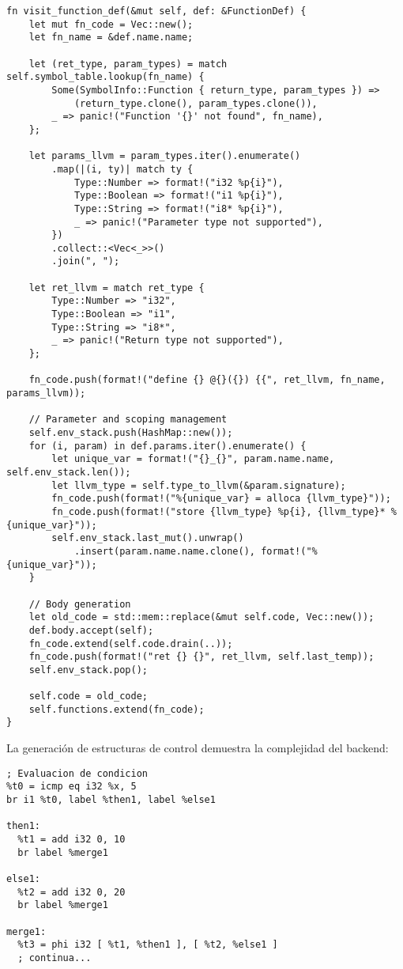 \documentclass[12pt,a4paper]{article}
\begin{document}
\begin{lstlisting}[style=rustcode,caption=Generación de funciones LLVM]
fn visit_function_def(&mut self, def: &FunctionDef) {
    let mut fn_code = Vec::new();
    let fn_name = &def.name.name;

    let (ret_type, param_types) = match self.symbol_table.lookup(fn_name) {
        Some(SymbolInfo::Function { return_type, param_types }) => 
            (return_type.clone(), param_types.clone()),
        _ => panic!("Function '{}' not found", fn_name),
    };

    let params_llvm = param_types.iter().enumerate()
        .map(|(i, ty)| match ty {
            Type::Number => format!("i32 %p{i}"),
            Type::Boolean => format!("i1 %p{i}"),
            Type::String => format!("i8* %p{i}"),
            _ => panic!("Parameter type not supported"),
        })
        .collect::<Vec<_>>()
        .join(", ");

    let ret_llvm = match ret_type {
        Type::Number => "i32",
        Type::Boolean => "i1", 
        Type::String => "i8*",
        _ => panic!("Return type not supported"),
    };

    fn_code.push(format!("define {} @{}({}) {{", ret_llvm, fn_name, params_llvm));

    // Parameter and scoping management
    self.env_stack.push(HashMap::new());
    for (i, param) in def.params.iter().enumerate() {
        let unique_var = format!("{}_{}", param.name.name, self.env_stack.len());
        let llvm_type = self.type_to_llvm(&param.signature);
        fn_code.push(format!("%{unique_var} = alloca {llvm_type}"));
        fn_code.push(format!("store {llvm_type} %p{i}, {llvm_type}* %{unique_var}"));
        self.env_stack.last_mut().unwrap()
            .insert(param.name.name.clone(), format!("%{unique_var}"));
    }

    // Body generation
    let old_code = std::mem::replace(&mut self.code, Vec::new());
    def.body.accept(self);
    fn_code.extend(self.code.drain(..));
    fn_code.push(format!("ret {} {}", ret_llvm, self.last_temp));
    self.env_stack.pop();
    
    self.code = old_code;
    self.functions.extend(fn_code);
}
\end{lstlisting}

La generación de estructuras de control demuestra la complejidad del backend:

\begin{lstlisting}[style=llvm,caption=Código LLVM generado para if-else]
; Evaluacion de condicion
%t0 = icmp eq i32 %x, 5
br i1 %t0, label %then1, label %else1

then1:
  %t1 = add i32 0, 10
  br label %merge1

else1:
  %t2 = add i32 0, 20
  br label %merge1

merge1:
  %t3 = phi i32 [ %t1, %then1 ], [ %t2, %else1 ]
  ; continua...
\end{lstlisting}
\end{document}
